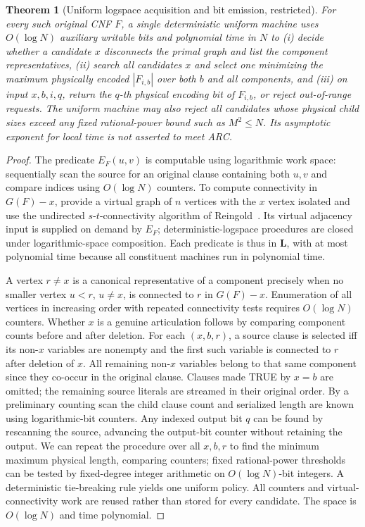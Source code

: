 \documentclass[11pt]{article}
\newtheorem{theorem}{Theorem}
\begin{document}
\begin{theorem}[Uniform logspace acquisition and bit emission, restricted]\label{thm:L}
For every such original CNF $F$, a single deterministic uniform machine uses $O(\log N)$ auxiliary writable bits and polynomial time in $N$ to (i) decide whether a candidate $x$ disconnects the primal graph and list the component representatives, (ii) search all candidates $x$ and select one minimizing the maximum \emph{physically encoded} $|F_{i,b}|$ over both $b$ and all components, and (iii) on input $x,b,i,q$, return the $q$-th physical encoding bit of $F_{i,b}$, or reject out-of-range requests. The uniform machine may also reject all candidates whose physical child sizes exceed any fixed rational-power bound such as $M^2\le N$. Its asymptotic exponent for local time is not asserted to meet ARC.
\end{theorem}
\begin{proof}
The predicate $E_F(u,v)$ is computable using logarithmic work space: sequentially scan the source for an original clause containing both $u,v$ and compare indices using $O(\log N)$ counters. To compute connectivity in $G(F)-x$, provide a virtual graph of $n$ vertices with the $x$ vertex isolated and use the undirected $s$-$t$-connectivity algorithm of Reingold~\cite{reingold}. Its virtual adjacency input is supplied on demand by $E_F$; deterministic-logspace procedures are closed under logarithmic-space composition. Each predicate is thus in $\mathbf L$, with at most polynomial time because all constituent machines run in polynomial time.

A vertex $r\ne x$ is a canonical representative of a component precisely when no smaller vertex $u<r$, $u\ne x$, is connected to $r$ in $G(F)-x$. Enumeration of all vertices in increasing order with repeated connectivity tests requires $O(\log N)$ counters. Whether $x$ is a genuine articulation follows by comparing component counts before and after deletion. For each $(x,b,r)$, a source clause is selected iff its non-$x$ variables are nonempty and the first such variable is connected to $r$ after deletion of $x$. All remaining non-$x$ variables belong to that same component since they co-occur in the original clause. Clauses made TRUE by $x=b$ are omitted; the remaining source literals are streamed in their original order. By a preliminary counting scan the child clause count and serialized length are known using logarithmic-bit counters. Any indexed output bit $q$ can be found by rescanning the source, advancing the output-bit counter without retaining the output. We can repeat the procedure over all $x,b,r$ to find the minimum maximum physical length, comparing counters; fixed rational-power thresholds can be tested by fixed-degree integer arithmetic on $O(\log N)$-bit integers. A deterministic tie-breaking rule yields one uniform policy. All counters and virtual-connectivity work are reused rather than stored for every candidate. The space is $O(\log N)$ and time polynomial.
\end{proof}
\end{document}
